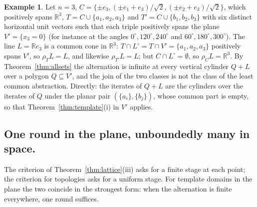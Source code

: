 \documentclass[11pt]{amsart}
\theoremstyle{definition}
\newtheorem{ex}[thm]{Example}
\begin{document}
\begin{ex}\label{ex:cyl}
Let $n=3$, $C=\{\pm e_3,(\pm e_1+e_3)/\sqrt2,(\pm e_2+e_3)/\sqrt2\}$,
which positively spans $\mathbb R^3$, $T=C\cup\{a_1,a_2,a_3\}$ and
$T'=C\cup\{b_1,b_2,b_3\}$ with six distinct horizontal unit vectors
such that each triple positively spans the plane $V'=\{x_3=0\}$ (for
instance at the angles $0^\circ,120^\circ,240^\circ$ and $60^\circ,
180^\circ,300^\circ$). The line $L=\mathbb Re_3$ is a common cone in
$\mathbb R^3$: $T\cap L^\circ=T\cap V'=\{a_1,a_2,a_3\}$ positively spans
$V'$, so $\rho_TL=L$, and likewise $\rho_{T'}L=L$; but $C\cap L^\circ=
\emptyset$, so $\rho_CL=\mathbb R^3$. By Theorem~\ref{thm:allsets} the
alternation is infinite at every vertical cylinder $Q+L$ over a polygon
$Q\subseteq V'$, and the join of the two classes is not the class of
the least common abstraction. Directly: the iterates of $Q+L$ are the
cylinders over the iterates of $Q$ under the planar pair $(\{a_i\},
\{b_j\})$, whose common part is empty, so that
Theorem~\ref{thm:template}(i) in $V'$ applies.
\end{ex}

\subsection*{One round in the plane, unboundedly many in space.}
The criterion of Theorem~\ref{thm:lattice}(iii) asks for a finite stage
at each point; the criterion for topologies asks for a uniform stage.
For template domains in the plane the two coincide in the strongest
form: when the alternation is finite everywhere, one round suffices.
\end{document}
